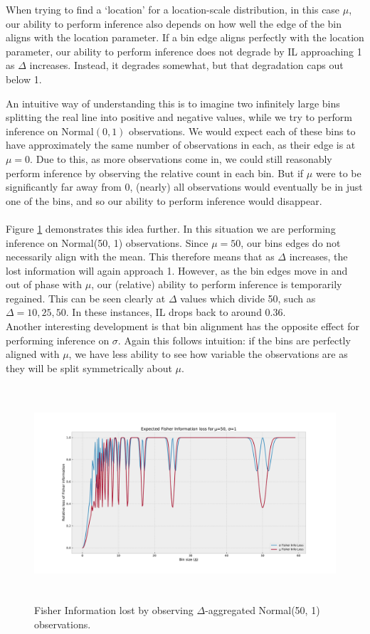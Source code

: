 \documentclass[11pt,a4,twosided,singlespacing,titlepagenumber=on,numbers=endperiod]{scrreprt}
\numberwithin{equation}{chapter} %
\theoremstyle{remark}
\begin{document}
When trying to find a `location' for a location-scale distribution, in this case $\mu$, our ability to perform inference also depends on how well the edge of the bin aligns with the location parameter. If a bin edge aligns perfectly with the location parameter, our ability to perform inference does not degrade by IL approaching 1 as $\Delta$ increases. Instead, it degrades somewhat, but that degradation caps out below 1.

An intuitive way of understanding this is to imagine two infinitely large bins splitting the real line into positive and negative values, while we try to perform inference on Normal$(0, 1)$ observations. We would expect each of these bins to have approximately the same number of observations in each, as their edge is at $\mu=0$. Due to this, as more observations come in, we could still reasonably perform inference by observing the relative count in each bin. But if $\mu$ were to be significantly far away from 0, (nearly) all observations would eventually be in just one of the bins, and so our ability to perform inference would disappear. \\\\
Figure \ref{fig:normal_50_1_info_loss} demonstrates this idea further. In this situation we are performing inference on Normal(50, 1) observations. Since $\mu=50$, our bins edges do not necessarily align with the mean. This therefore means that as $\Delta$ increases, the lost information will again approach 1. However, as the bin edges move in and out of phase with $\mu$, our (relative) ability to perform inference is temporarily regained. This can be seen clearly at $\Delta$ values which divide 50, such as $\Delta=10, 25, 50$. In these instances, IL drops back to around $0.36$. \\
Another interesting development is that bin alignment has the opposite effect for performing inference on $\sigma$. Again this follows intuition: if the bins are perfectly aligned with $\mu$, we have less ability to see how variable the observations are as they will be split symmetrically about $\mu$.
\begin{figure}[!h]
	\includegraphics[height=8cm, width=14cm]{mu50sig1.pdf}
	\centering
	\caption{Fisher Information lost by observing $\Delta$-aggregated Normal(50, 1) observations.}
	\label{fig:normal_50_1_info_loss}
\end{figure}\noindent
\clearpage
\end{document}
